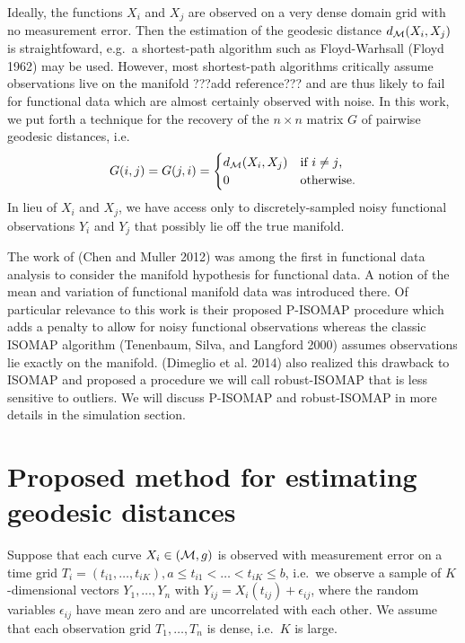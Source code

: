 Ideally, the functions \(X_i\) and \(X_j\) are observed on a very dense
domain grid with no measurement error. Then the estimation of the
geodesic distance \(d_{\mathcal{M}}(X_i,X_j)\) is straightfoward, e.g.~a
shortest-path algorithm such as Floyd-Warhsall (Floyd 1962) may be used.
However, most shortest-path algorithms critically assume observations
live on the manifold ???add reference??? and are thus likely to fail for
functional data which are almost certainly observed with noise. In this
work, we put forth a technique for the recovery of the \(n{\times}n\)
matrix \(G\) of pairwise geodesic distances, i.e.\\
\[
G(i,j)=G(j,i) = \begin{cases} 
      d_{\mathcal{M}} (X_i,X_j) & \textrm{if $i\neq j$,} \\
      0 & \textrm{otherwise.}
   \end{cases}
\] In lieu of \(X_i\) and \(X_j\), we have access only to
discretely-sampled noisy functional observations \(Y_i\) and \(Y_j\)
that possibly lie off the true manifold.

The work of (Chen and Muller 2012) was among the first in functional
data analysis to consider the manifold hypothesis for functional data. A
notion of the mean and variation of functional manifold data was
introduced there. Of particular relevance to this work is their proposed
P-ISOMAP procedure which adds a penalty to allow for noisy functional
observations whereas the classic ISOMAP algorithm (Tenenbaum, Silva, and
Langford 2000) assumes observations lie exactly on the manifold.
(Dimeglio et al. 2014) also realized this drawback to ISOMAP and
proposed a procedure we will call robust-ISOMAP that is less sensitive
to outliers. We will discuss P-ISOMAP and robust-ISOMAP in more details
in the simulation section.

\section{Proposed method for estimating geodesic
distances}\label{proposed-method-for-estimating-geodesic-distances}

Suppose that each curve \(X_i \in (\mathcal{M},g)\) is observed with measurement
error on a time grid
\(T_i=(t_{i1},\ldots,t_{iK}), a \le t_{i1} < \ldots < t_{iK} \le b\),
i.e.~we observe a sample of \(K\)-dimensional vectors \(Y_1,\ldots,Y_n\)
with \(Y_{ij} = X_i(t_{ij}) + \epsilon_{ij}\), where the random
variables \(\epsilon_{ij}\) have mean zero and are uncorrelated with
each other. We assume that each observation grid \(T_1,\ldots,T_n\) is
dense, i.e.~\(K\) is large.

